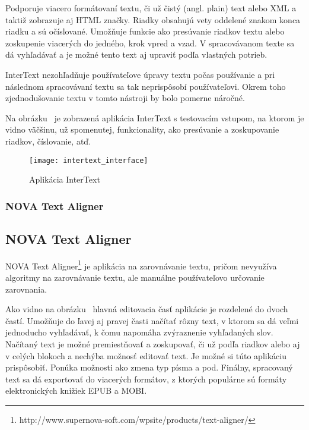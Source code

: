 Podporuje viacero formátovaní textu, či už čistý (angl. plain) text alebo XML a taktiž zobrazuje aj HTML značky. Riadky obsahujú vety oddelené znakom konca riadku a sú očíslované. Umožňuje funkcie ako presúvanie riadkov textu alebo zoskupenie viacerých do jedného, krok vpred a vzad. V spracovávanom texte sa dá vyhľadávať a je možné tento text aj upraviť podľa vlastných potrieb.

InterText nezohľadňuje používateľove úpravy textu počas používanie a pri následnom spracovávaní textu sa tak neprispôsobí používateľovi. Okrem toho zjednodušovanie textu v tomto nástroji by bolo pomerne náročné.

Na obrázku~ je zobrazená aplikácia InterText s testovacím vstupom, na ktorom je vidno väčšinu, už spomenutej, funkcionality, ako presúvanie a zoskupovanie riadkov, číslovanie, atď.

\begin{figure}[H]
	\begin{center}\texttt{[image: intertext\_interface]}\end{center}
	\caption[Aplikácia InterText]{Aplikácia InterText}\label{fig:intertext_interface}
\end{figure}

%
%
{
	\subsubsection{NOVA Text Aligner}
}
{
	\subsection{NOVA Text Aligner}
}
NOVA Text Aligner\footnote{http://www.supernova-soft.com/wpsite/products/text-aligner/} je aplikácia na zarovnávanie textu, pričom nevyužíva algoritmy na zarovnávanie textu, ale manuálne používateľovo určovanie zarovnania.

Ako vidno na obrázku~ hlavná editovacia časť aplikácie je rozdelené do dvoch častí. Umožňuje do ľavej aj pravej časti načítať rôzny text, v ktorom sa dá veľmi jednoducho vyhľadávať, k čomu napomáha zvýraznenie vyhľadaných slov. Načítaný text je možné premiestňovať a zoskupovať, či už podľa riadkov alebo aj v celých blokoch a nechýba možnosť editovať text. Je možné si túto aplikáciu prispôsobiť. Ponúka možnosti ako zmena typ písma a pod. Finálny, spracovaný text sa dá exportovať do viacerých formátov, z ktorých populárne sú formáty elektronických knižiek EPUB a MOBI.

